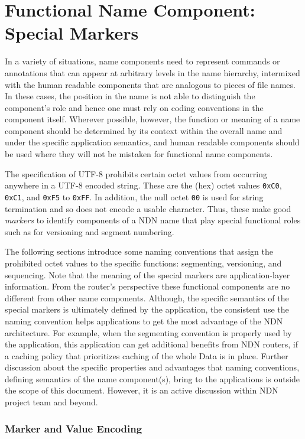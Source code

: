 \section{Functional Name Component: Special Markers}

In a variety of situations, name components need to represent commands or annotations that can appear at arbitrary levels in the name hierarchy, intermixed with the human readable components that are analogous to pieces of file names.
In these cases, the position in the name is not able to distinguish the component’s role and hence one must rely on coding conventions in the component itself.
Wherever possible, however, the function or meaning of a name component should be determined by its context within the overall name and under the specific application semantics, and human readable components should be used where they will not be mistaken for functional name components.

The specification of UTF-8 prohibits certain octet values from occurring anywhere in a UTF-8 encoded string.
These are the (hex) octet values \verb|0xC0|, \verb|0xC1|, and \verb|0xF5| to \verb|0xFF|.
In addition, the null octet \verb|00| is used for string termination and so does not encode a usable character.
Thus, these make good \emph{markers} to identify components of a NDN name that play special functional roles such as for versioning and segment numbering.

The following sections introduce some naming conventions that assign the prohibited octet values to the specific functions: segmenting, versioning, and sequencing.
Note that the meaning of the special markers are application-layer information.
From the router's perspective these functional components are no different from other name components.
Although, the specific semantics of the special markers is ultimately defined by the application, the consistent use the naming convention helps applications to get the most advantage of the NDN architecture.
For example, when the segmenting convention is properly used by the application, this application can get additional benefits from NDN routers, if a caching policy that prioritizes caching of the whole Data is in place.
Further discussion about the specific properties and advantages that naming conventions, defining semantics of the name component(s), bring to the applications is outside the scope of this document.
However, it is an active discussion within NDN project team and beyond.

\subsubsection{Marker and Value Encoding}
\label{sec:marker-encoding}

